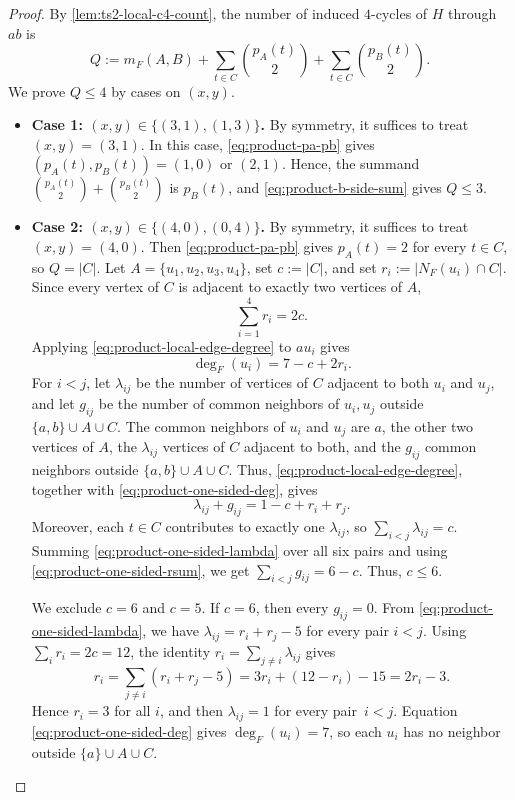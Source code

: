\documentclass[10pt,a4paper]{amsart}
\begin{document}
\begin{proof}
By \cref{lem:ts2-local-c4-count}, the number of induced $4$-cycles of $H$ through $ab$ is
\begin{equation}
\label{eq:product-q-count}
Q:=m_F(A,B)+\sum_{t\in C}\binom{p_A(t)}2
+\sum_{t\in C}\binom{p_B(t)}2.
\end{equation}
We prove $Q\le 4$ by cases on $(x,y)$.

\begin{itemize}
\item \textbf{Case 1: $(x,y)\in\{(3,1),(1,3)\}$.}
By symmetry, it suffices to treat $(x,y)=(3,1)$.
In this case, \eqref{eq:product-pa-pb} gives $(p_A(t),p_B(t))=(1,0)$ or $(2,1)$.
Hence, the summand $\displaystyle \binom{p_A(t)}2+\binom{p_B(t)}2$ is $p_B(t)$, and \eqref{eq:product-b-side-sum} gives $Q\le 3$.

\item \textbf{Case 2: $(x,y)\in\{(4,0),(0,4)\}$.}
By symmetry, it suffices to treat $(x,y)=(4,0)$.
Then \eqref{eq:product-pa-pb} gives $p_A(t)=2$ for every $t\in C$, so $Q=|C|$.
Let $A=\{u_1,u_2,u_3,u_4\}$, set $c:=|C|$, and set $r_i:=|N_F(u_i)\cap C|$.
Since every vertex of $C$ is adjacent to exactly two vertices of $A$,
\begin{equation}
\label{eq:product-one-sided-rsum}
\sum_{i=1}^4 r_i=2c.
\end{equation}
Applying \eqref{eq:product-local-edge-degree} to $au_i$ gives
\begin{equation}
\label{eq:product-one-sided-deg}
\deg_F(u_i)=7-c+2r_i.
\end{equation}
For $i<j$, let $\lambda_{ij}$ be the number of vertices of $C$ adjacent to both $u_i$ and $u_j$, and let $g_{ij}$ be the number of common neighbors of $u_i,u_j$ outside $\{a,b\}\cup A\cup C$.
The common neighbors of $u_i$ and $u_j$ are $a$, the other two vertices of $A$, the $\lambda_{ij}$ vertices of $C$ adjacent to both, and the $g_{ij}$ common neighbors outside $\{a,b\}\cup A\cup C$.
Thus, \eqref{eq:product-local-edge-degree}, together with \eqref{eq:product-one-sided-deg}, gives
\begin{equation}
\label{eq:product-one-sided-lambda}
\lambda_{ij}+g_{ij}=1-c+r_i+r_j.
\end{equation}
Moreover, each $t\in C$ contributes to exactly one $\lambda_{ij}$, so $\displaystyle \sum_{i<j}\lambda_{ij}=c$.
Summing \eqref{eq:product-one-sided-lambda} over all six pairs and using \eqref{eq:product-one-sided-rsum}, we get $\displaystyle \sum_{i<j}g_{ij}=6-c$.
Thus, $c\le 6$.

We exclude $c=6$ and $c=5$.
If $c=6$, then every $g_{ij}=0$.
From \eqref{eq:product-one-sided-lambda}, we have $\lambda_{ij}=r_i+r_j-5$ for every pair $i<j$.
Using $\displaystyle \sum_i r_i=2c=12$, the identity $\displaystyle r_i=\sum_{j\ne i}\lambda_{ij}$ gives
\[
	r_i=\sum_{j\ne i}(r_i+r_j-5)=3r_i+(12-r_i)-15=2r_i-3.
\]
Hence $r_i=3$ for all $i$, and then $\lambda_{ij}=1$ for every pair~$i<j$.
Equation \eqref{eq:product-one-sided-deg} gives $\deg_F(u_i)=7$, so each $u_i$ has no neighbor outside $\{a\}\cup A\cup C$.


\end{itemize}
\end{proof}
\end{document}
